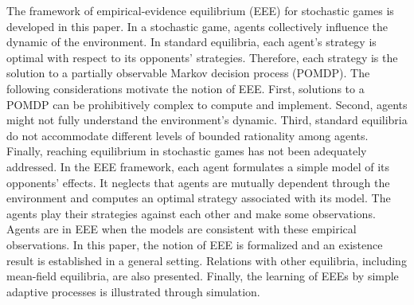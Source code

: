 The framework of empirical-evidence equilibrium (EEE) for stochastic games is developed in this paper.
In a stochastic game, agents collectively influence the dynamic of the environment.
In standard equilibria, each agent's strategy is optimal with respect to its opponents' strategies.
Therefore, each strategy is the solution to a partially observable Markov decision process (POMDP).
The following considerations motivate the notion of EEE.
First, solutions to a POMDP can be prohibitively complex to compute and implement.
Second, agents might not fully understand the environment's dynamic.
Third, standard equilibria do not accommodate different levels of bounded rationality among agents.
Finally, reaching equilibrium in stochastic games has not been adequately addressed.
In the EEE framework, each agent formulates a simple model of its opponents' effects.
It neglects that agents are mutually dependent through the environment and computes an optimal strategy associated with its model.
The agents play their strategies against each other and make some observations.
Agents are in EEE when the models are consistent with these empirical observations.
In this paper, the notion of EEE is formalized and an existence result is established in a general setting.
Relations with other equilibria, including mean-field equilibria, are also presented.
Finally, the learning of EEEs by simple adaptive processes is illustrated through simulation.
